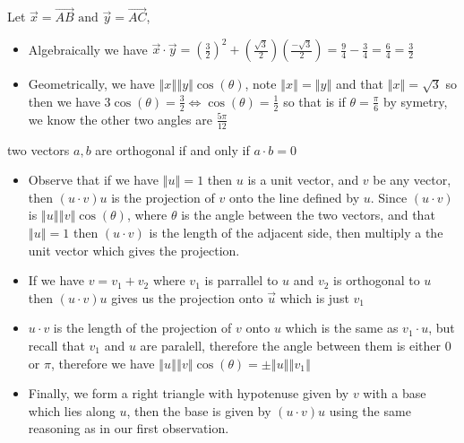 \documentclass[11pt]{book}
\begin{document}
Let $\vec{x} = \vec{AB} \text{ and } \vec{y} = \vec{AC} $, 
\begin{itemize}
    \item Algebraically we have $\vec{x}  \cdot \vec{y} = \left( \frac{3}{2} \right) ^2  + \left( \frac{\sqrt{3} }{2} \right) \left( \frac{ - \sqrt{3} }{2} \right) = \frac{9}{4} - \frac{3}{4}= \frac{6}{4}= \frac{3}{2}$ 
    \item Geometrically, we have $\left\Vert x \right\Vert  \left\Vert y \right\Vert \cos  \left( \theta \right) $,  note $\left\Vert x \right\Vert = \left\Vert y \right\Vert $ and that $\left\Vert x \right\Vert = \sqrt{3} $ so then we have $3\cos  \left( \theta \right) = \frac{3}{2} \Leftrightarrow \cos  \left( \theta \right) = \frac{1}{2}$ so that is if $\theta = \frac{\pi }{6}$ by symetry, we know the other two angles are $\frac{5\pi }{12}$ 
\end{itemize}



\newpage

\begin{defn}[Orthogonality]\label{defn:orthogonality}
    two vectors $a,b$ are orthogonal if and only if $a \cdot b= 0$ 
\end{defn}
\begin{itemize}
    \item Observe that if we have $\left\Vert u \right\Vert = 1$ then $u$ is a unit vector, and $v$ be any vector, then $\left( u \cdot v \right) u$ is the projection of $v$ onto the line defined by $u$. Since $\left( u \cdot v \right) $ is $\left\Vert u \right\Vert \left\Vert v \right\Vert \cos  \left( \theta \right) $, where $\theta $ is the angle between the two vectors, and that $\left\Vert u \right\Vert = 1$ then $\left( u \cdot v \right) $ is the length of the adjacent side, then multiply a the unit vector which gives the projection.  
    \item If we have $v = v_1 + v_2$ where $v_1$ is parrallel to $u$ and $v_2$ is orthogonal to $u$ then $\left( u \cdot v \right) u$ gives us the projection onto $\vec{u} $ which is just $v_{1} $
        \item $u \cdot v$ is the length of the projection of $v$ onto $u$ which is the same as $v_1 \cdot u$, but recall that $v_1$ and $u$ are paralell, therefore the angle between them is either $0$ or $\pi $,  therefore we have $\left\Vert u \right\Vert \left\Vert v \right\Vert \cos \left( \theta \right) = \pm \left\Vert u \right\Vert \left\Vert v_1 \right\Vert $   
        \item Finally, we form a right triangle with hypotenuse given by $v$ with a base which lies along $u$, then the base is given by $\left( u \cdot v \right) u$ using the same reasoning as in our first observation.
\end{itemize}
\end{document}
